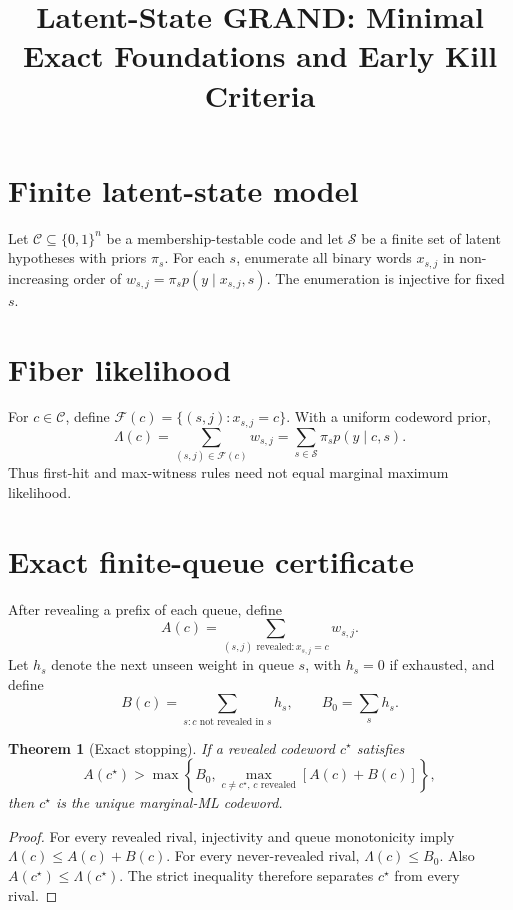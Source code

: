 \documentclass[11pt]{article}
\title{Latent-State GRAND: Minimal Exact Foundations and Early Kill Criteria}
\author{}
\date{}
\newtheorem{theorem}{Theorem}
\begin{document}
\maketitle

\section{Finite latent-state model}
Let $\mathcal C\subseteq\{0,1\}^n$ be a membership-testable code and let
$\mathcal S$ be a finite set of latent hypotheses with priors $\pi_s$.  For each
$s$, enumerate all binary words $x_{s,j}$ in non-increasing order of
$w_{s,j}=\pi_s p(y\mid x_{s,j},s)$.  The enumeration is injective for fixed $s$.

\section{Fiber likelihood}
For $c\in\mathcal C$, define
$\mathcal F(c)=\{(s,j):x_{s,j}=c\}$.  With a uniform codeword prior,
\begin{equation}
\Lambda(c)=\sum_{(s,j)\in\mathcal F(c)}w_{s,j}
          =\sum_{s\in\mathcal S}\pi_s p(y\mid c,s).
\end{equation}
Thus first-hit and max-witness rules need not equal marginal maximum likelihood.

\section{Exact finite-queue certificate}
After revealing a prefix of each queue, define
\begin{equation}
 A(c)=\sum_{(s,j)\text{ revealed}:x_{s,j}=c}w_{s,j}.
\end{equation}
Let $h_s$ denote the next unseen weight in queue $s$, with $h_s=0$ if exhausted,
and define
\begin{equation}
 B(c)=\sum_{s:c\text{ not revealed in }s}h_s,
 \qquad B_0=\sum_s h_s.
\end{equation}
\begin{theorem}[Exact stopping]
If a revealed codeword $c^\star$ satisfies
\begin{equation}
 A(c^\star)>
 \max\left\{B_0,\max_{c\ne c^\star,\,c\text{ revealed}}[A(c)+B(c)]\right\},
\end{equation}
then $c^\star$ is the unique marginal-ML codeword.
\end{theorem}
\begin{proof}
For every revealed rival, injectivity and queue monotonicity imply
$\Lambda(c)\le A(c)+B(c)$.  For every never-revealed rival,
$\Lambda(c)\le B_0$.  Also $A(c^\star)\le\Lambda(c^\star)$.  The strict
inequality therefore separates $c^\star$ from every rival.
\end{proof}
\end{document}
